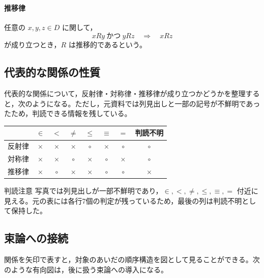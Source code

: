 \documentclass[../main.tex]{subfiles}
\begin{document}
\paragraph{推移律}
任意の \(x,y,z \in D\) に関して，
\[
  xRy \ \text{かつ}\ yRz
  \quad \Rightarrow \quad
  xRz
\]
が成り立つとき，\(R\) は推移的であるという。

\subsection{代表的な関係の性質}

代表的な関係について，反射律・対称律・推移律が成り立つかどうかを整理すると，次のようになる。ただし，元資料では列見出しと一部の記号が不鮮明であったため，判読できる情報を残している。

\begin{center}
\begin{tabular}{c|ccccccc}
\toprule
 & \(\in\) & \(<\) & \(\neq\) & \(\leq\) & \(\equiv\) & \(=\) & 判読不明 \\
\midrule
反射律 & \(\times\) & \(\times\) & \(\times\) & \(\circ\) & \(\times\) & \(\circ\) & \(\circ\) \\
対称律 & \(\times\) & \(\times\) & \(\circ\) & \(\times\) & \(\circ\) & \(\times\) & \(\circ\) \\
推移律 & \(\times\) & \(\circ\) & \(\times\) & \(\times\) & \(\circ\) & \(\circ\) & \(\times\) \\
\bottomrule
\end{tabular}
\end{center}

\begin{sidebox}[TBred]{判読注意}
  写真では列見出しが一部不鮮明であり，\(\in,<,\neq,\leq,\equiv,=\) 付近に見える。元の表には各行7個の判定が残っているため，最後の列は判読不明として保持した。
\end{sidebox}

\subsection{束論への接続}

関係を矢印で表すと，対象のあいだの順序構造を図として見ることができる。次のような有向図は，後に扱う束論への導入になる。
\end{document}
